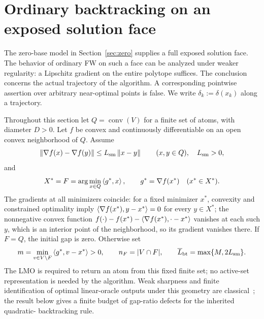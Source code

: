 \section{Ordinary backtracking on an exposed solution face}
\label{sec:face}
The zero-base model in Section~\ref{sec:zero} supplies a full exposed
solution face. The behavior of ordinary FW on such a face can be analyzed
under weaker regularity: a Lipschitz gradient on the entire polytope
suffices. The conclusion concerns the actual trajectory of the algorithm.
A corresponding pointwise assertion over arbitrary near-optimal points
is false. We write $\delta_k:=\delta(x_k)$ along a trajectory.

Throughout this section let $Q=\operatorname{conv}(V)$ for a finite
set of atoms, with diameter $D>0$. Let $f$ be convex and continuously
differentiable on an open convex neighborhood of $Q$. Assume
\begin{equation}\label{face:lip}
 \left\|\nabla f(x)-\nabla f(y)\right\|\le L_{\rm sm}\left\|x-y\right\|
 \qquad (x,y\in Q),\quad L_{\rm sm}>0,
\end{equation}
and
\begin{equation}\label{face:exposed}
 X^*=F=\arg\min_{x\in Q}\left\langle g^*,x\right\rangle,\qquad
 g^*=\nabla f(x^*)\quad(x^*\in X^*).
\end{equation}
The gradients at all minimizers coincide: for a fixed minimizer $x^*$,
convexity and constrained optimality imply
$\left\langle\nabla f(x^*),y-x^*\right\rangle=0$ for every $y\in X^*$; the
nonnegative convex function
$f(\cdot)-f(x^*)-\left\langle\nabla f(x^*),\cdot-x^*\right\rangle$ vanishes at
each such $y$, which is an interior point of the neighborhood, so its
gradient vanishes there. If $F=Q$, the initial gap is zero. Otherwise set
\begin{equation}\label{face:margin}
 m=\min_{v\in V\setminus F}\left\langle g^*,v-x^*\right\rangle>0,
 \qquad n_F=|V\cap F|,
 \qquad \overline L_{\rm bt}=\max\{M,2L_{\rm sm}\}.
\end{equation}
The LMO is required to return an atom from this fixed finite set; no
active-set representation is needed by the algorithm. Weak sharpness
and finite identification of optimal linear-oracle outputs under this
geometry are classical~\cite{burkeferris}; the result below gives a
finite budget of gap-ratio defects for the inherited quadratic-
backtracking rule.

